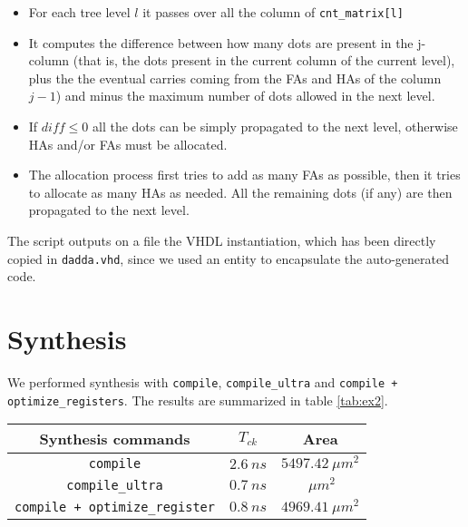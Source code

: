 \begin{itemize}
    \item For each tree level $l$ it passes over all the column of \verb|cnt_matrix[l]|
    \item It computes the difference between how many dots are present in the j-column (that is, the dots present in the current column of the current level), plus the the eventual carries coming from the FAs and HAs of the column $j-1$) and minus the maximum number of dots allowed in the next level.
    \item If $diff \leq 0$ all the dots can be simply propagated to the next level, otherwise HAs and/or FAs must be allocated.
    \item The allocation process first tries to add as many FAs as possible, then it tries to allocate as many HAs as needed. All the remaining dots (if any) are then propagated to the next level.
\end{itemize}

The script outputs on a file the VHDL instantiation, which has been directly copied in \verb|dadda.vhd|, since we used an entity to encapsulate the auto-generated code. 

\section{Synthesis}

We performed synthesis with \verb|compile|, \verb|compile_ultra| and \verb|compile + optimize_registers|. The results are summarized
in table \ref{tab:ex2}.

\begin{center}
    \label{tab:ex2}
    \begin{tabular}{ |c|c|c| }
        \hline
        Synthesis commands & $T_{ck}$ & Area \\
        \hline
        \verb|compile| & $2.6\ ns$ & $5497.42\ \mu m^2$ \\
        \hline
        \verb|compile_ultra| & $0.7\ ns$ & $\ \mu m^2$ \\
        \hline
        \verb|compile + optimize_register| & $0.8\ ns$ & $4969.41\ \mu m^2$ \\
        \hline
    \end{tabular}
\end{center}